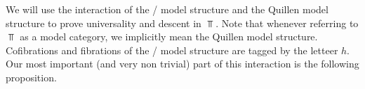 We will use the interaction of the \Strom/ model structure and the Quillen model structure to prove universality and descent in $\Top$.
Note that whenever referring to $\Top$ as a model category, we implicitly mean the Quillen model structure. 
Cofibrations and fibrations of the \Strom/ model structure are tagged by the letteer $h$.
Our most important (and very non trivial) part of this interaction is the following proposition.
